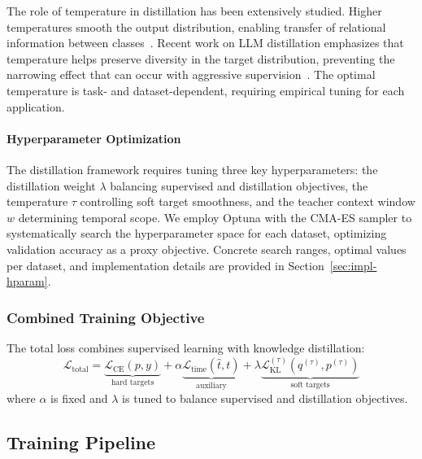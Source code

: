 The role of temperature in distillation has been extensively studied. Higher temperatures smooth the output distribution, enabling transfer of relational information between classes~\cite{hintonDistillingKnowledgeNeural2015}. Recent work on LLM distillation emphasizes that temperature helps preserve diversity in the target distribution, preventing the narrowing effect that can occur with aggressive supervision~\cite{singhORPODistillMixedPolicyPreference2025}. The optimal temperature is task- and dataset-dependent, requiring empirical tuning for each application.

\paragraph{Hyperparameter Optimization}
The distillation framework requires tuning three key hyperparameters: the distillation weight $\lambda$ balancing supervised and distillation objectives, the temperature $\tau$ controlling soft target smoothness, and the teacher context window $w$ determining temporal scope. We employ Optuna with the CMA-ES sampler to systematically search the hyperparameter space for each dataset, optimizing validation accuracy as a proxy objective. Concrete search ranges, optimal values per dataset, and implementation details are provided in Section~\ref{sec:impl-hparam}.

\subsubsection{Combined Training Objective}

The total loss combines supervised learning with knowledge distillation:
\begin{equation}
    \mathcal{L}_{\text{total}} = \underbrace{\mathcal{L}_{\text{CE}}(p, y)}_{\text{hard targets}} +
    \alpha \underbrace{\mathcal{L}_{\text{time}}(\hat{t}, t)}_{\text{auxiliary}} +
    \lambda \underbrace{\mathcal{L}_{\text{KL}}^{(\tau)}(q^{(\tau)}, p^{(\tau)})}_{\text{soft targets}}
    \label{eq:total-loss}
\end{equation}
where $\alpha$ is fixed and $\lambda$ is tuned to balance supervised and distillation objectives.

\subsection{Training Pipeline}
\label{sec:method-training}

